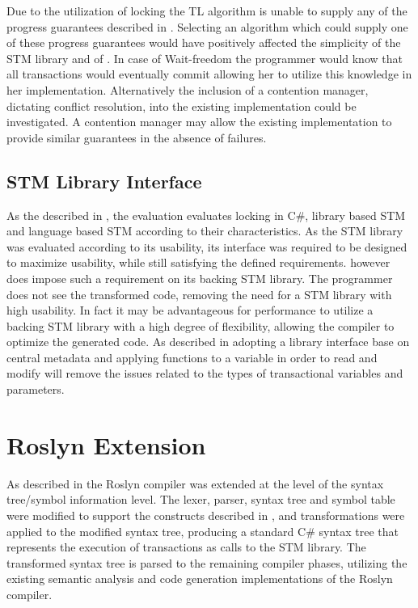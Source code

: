 Due to the utilization of locking the TL algorithm is unable to supply any of the progress guarantees described in . Selecting an algorithm which could supply one of these progress guarantees would have positively affected the simplicity of the \ac{STM} library and of \stmname. In case of Wait-freedom the programmer would know that all transactions would eventually commit allowing her to utilize this knowledge in her implementation. Alternatively the inclusion of a contention manager, dictating conflict resolution, into the existing implementation could be investigated. A contention manager may allow the existing implementation to provide similar guarantees in the absence of failures.

\subsection{STM Library Interface}
As the described in , the evaluation evaluates locking in C\#, library based \ac{STM} and language based \ac{STM} according to their characteristics. As the \ac{STM} library was evaluated according to its usability, its interface was required to be designed to maximize usability, while still satisfying the defined requirements. \stmname however does impose such a requirement on its backing \ac{STM} library. The programmer does not see the transformed code, removing the need for a \ac{STM} library with high usability. In fact it may be advantageous for performance to utilize a backing \ac{STM} library with a high degree of flexibility, allowing the compiler to optimize the generated code. As described in  adopting a library interface base on central metadata and applying functions to a variable in order to read and modify will remove the issues related to the types of transactional variables and  parameters.

\section{Roslyn Extension}\label{sec:reflection_roslyn_extension}
As described in  the Roslyn compiler was extended at the level of the syntax tree/symbol information level. The lexer, parser, syntax tree and symbol table were modified to support the constructs described in , and transformations were applied to the modified syntax tree, producing a standard C\# syntax tree that represents the execution of transactions as calls to the \ac{STM} library. The transformed syntax tree is parsed to the remaining compiler phases, utilizing the existing semantic analysis and code generation implementations of the Roslyn compiler. 

